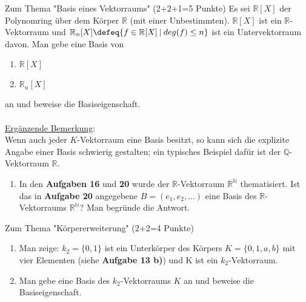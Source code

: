 \documentclass{uebblatt}
\begin{document}

\begin{aufgabe}{Zum Thema "Basis eines Vektorraums" (2+2+1=5 Punkte)}
Es sei $\mathbb{R}[X]$ der Polynomring über dem Körper $\mathbb{R}$ (mit einer Unbestimmten). $\mathbb{R}[X]$ ist ein $\mathbb{R}$-Vektorraum und $\mathbb{R}_n[X] \defeq \{f \in \mathbb{R}[X] \> | \> deg(f) \le n\}$ ist ein Untervektorraum davon. Man gebe eine Basis von
\begin{enumerate}
\item $\mathbb{R}[X]$
\item $\mathbb{R}_n[X]$
\end{enumerate}
an und beweise die Basiseigenschaft.\\ \\
\underline{Ergänzende Bemerkung}: \\
Wenn auch jeder $K$-Vektorraum eine Basis besitzt, so kann sich    die explizite Angabe einer Basis schwierig gestalten; ein typisches Beispiel dafür ist der $\mathbb{Q}$-Vektorraum $\mathbb{R}$. 
\begin{enumerate}[resume]
\item In den \textbf{Aufgaben 16} und \textbf{20} wurde der $\mathbb{R}$-Vektorraum $\mathbb{R}^\mathbb{N}$ thematisiert. Ist das in \textbf{Aufgabe 20} angegebene $B = (e_1, e_2, …)$ eine Basis des $\mathbb{R}$-Vektorraums $\mathbb{R}^\mathbb{N}$? Man begründe die Antwort.
\end{enumerate}
\end{aufgabe}


\begin{aufgabe}{Zum Thema "Körpererweiterung" (2+2=4 Punkte)}
\begin{enumerate}
\item Man zeige: $k_2 = \{0, 1\}$ ist ein Unterkörper des Körpers $K = \{0, 1, a, b\}$ mit vier Elementen (siehe \textbf{Aufgabe 13 b)}) und K ist ein $k_2$-Vektorraum.
\item Man gebe eine Basis des $k_2$-Vektorraums $K$ an und beweise die Basiseigenschaft.
\end{enumerate}
\end{aufgabe}
\end{document}
